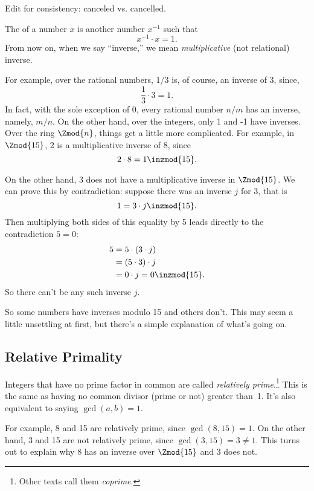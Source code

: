 \begin{editingnotes}
Edit for consistency: canceled vs. cancelled.
\end{editingnotes}

The  of a number $x$ is another number
$x^{-1}$ such that
\[
x^{-1} \cdot x  = 1.
\]
From now on, when we say ``inverse,'' we mean \emph{multiplicative}
(not relational) inverse.

For example, over the rational numbers, $1 / 3$ is, of course, an
inverse of 3, since,
\[
\frac{1}{3} \cdot 3 = 1.
\]
In fact, with the sole exception of 0, every rational number $n/m$ has
an inverse, namely, $m/n$.  On the other hand, over the integers, only
1 and -1 have inverses.  Over the ring%
$\Zmod{n}$, things get a little more complicated.  For 
example, in $\Zmod{15}$, 2 is a multiplicative inverse of 8, since
\[
2 \cdot 8 = 1 \inzmod{15}.
\]

On the other hand, 3 does not have a multiplicative inverse in
$\Zmod{15}$.  We can prove this by contradiction: suppose there was an
inverse $j$ for 3, that is
\[
1 = 3 \cdot j \inzmod{15}.
\]
Then multiplying both sides of this equality by 5 leads directly to
the contradiction $5 = 0$:
\begin{align*}
5 & = 5 \cdot (3 \cdot j)\\
  & = (5 \cdot 3) \cdot j\\
  & = 0 \cdot j = 0 \inzmod{15}.
\end{align*}
So there can't be any such inverse $j$.

So some numbers have inverses modulo 15 and others don't.  This may seem
a little unsettling at first, but there's a simple explanation of
what's going on.

\subsection{Relative Primality}

Integers that have no prime factor in common are called
\emph{relatively prime}.\footnote{Other texts call them
  \emph{coprime}.}  This is the same as having no common divisor
(prime or not) greater than~1.  It's also equivalent to saying
$\gcd(a, b) = 1$.

For example, 8 and 15 are relatively prime, since $\gcd(8, 15) = 1$.
On the other hand, 3 and 15 are not relatively prime, since $\gcd(3,
15) = 3 \neq 1$.  This turns out to explain why 8 has an inverse over
$\Zmod{15}$ and 3 does not.

